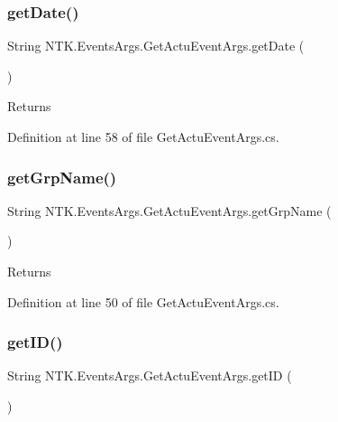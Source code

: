 \subsubsection{\texorpdfstring{getDate()}{getDate()}}
{\footnotesize\ttfamily String N\+T\+K.\+Events\+Args.\+Get\+Actu\+Event\+Args.\+get\+Date (\begin{DoxyParamCaption}{ }\end{DoxyParamCaption})}





\begin{DoxyReturn}{Returns}

\end{DoxyReturn}


Definition at line 58 of file Get\+Actu\+Event\+Args.\+cs.

\mbox{\label{class_n_t_k_1_1_events_args_1_1_get_actu_event_args_af2dbce9115426108956b6f1b04563799}} 
\subsubsection{\texorpdfstring{getGrpName()}{getGrpName()}}
{\footnotesize\ttfamily String N\+T\+K.\+Events\+Args.\+Get\+Actu\+Event\+Args.\+get\+Grp\+Name (\begin{DoxyParamCaption}{ }\end{DoxyParamCaption})}





\begin{DoxyReturn}{Returns}

\end{DoxyReturn}


Definition at line 50 of file Get\+Actu\+Event\+Args.\+cs.

\mbox{\label{class_n_t_k_1_1_events_args_1_1_get_actu_event_args_a4a11136a4dda587c2df2fa439dfa2ecb}} 
\subsubsection{\texorpdfstring{getID()}{getID()}}
{\footnotesize\ttfamily String N\+T\+K.\+Events\+Args.\+Get\+Actu\+Event\+Args.\+get\+ID (\begin{DoxyParamCaption}{ }\end{DoxyParamCaption})}





